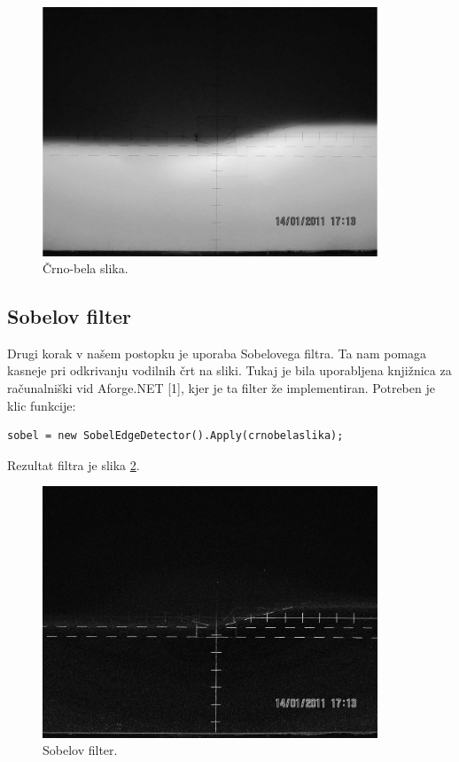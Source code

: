 \documentclass[oneside, a4paper, 12pt]{book}
\begin{document}
\begin{figure}
\begin{center}
\includegraphics[width=10cm]{slike/crno-bela-slika.jpg}
\end{center}
\caption{Črno-bela slika.}
\label{pic:bw}
\end{figure}

\subsection{Sobelov filter}
Drugi korak v našem postopku je uporaba Sobelovega filtra. Ta nam pomaga kasneje pri odkrivanju  vodilnih črt na sliki. Tukaj je bila uporabljena knjižnica za računalniški vid Aforge.NET [1], kjer je ta filter že implementiran. Potreben je klic funkcije:
\begin{verbatim}
sobel = new SobelEdgeDetector().Apply(crnobelaslika);
\end{verbatim}

Rezultat filtra je slika \ref{pic:sobel}.

\begin{figure}
\begin{center}
\includegraphics[width=10cm]{slike/sobel.jpg}
\end{center}
\caption{Sobelov filter.}
\label{pic:sobel}
\end{figure}
\end{document}
